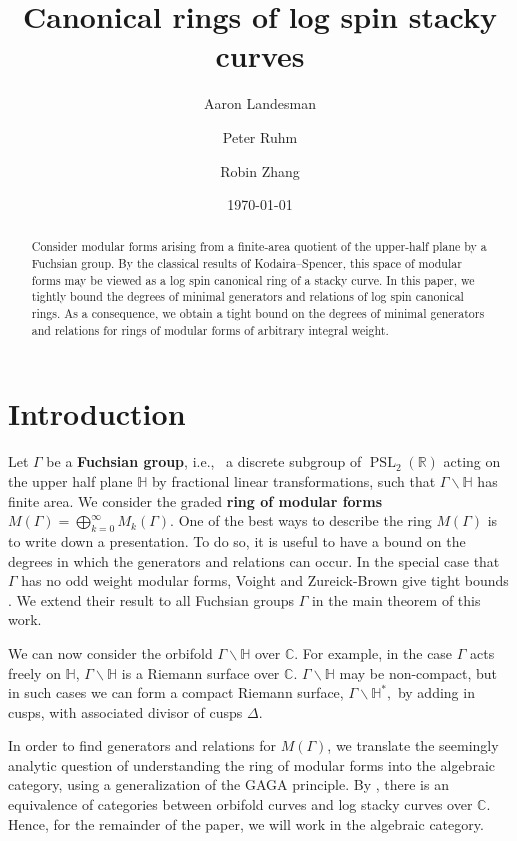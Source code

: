 \documentclass{amsart}
\title{Canonical rings of log spin stacky curves}
\author{Aaron Landesman}
\author{Peter Ruhm}
\author{Robin Zhang}
\date{\today}
\theoremstyle{plain}
\theoremstyle{definition}
\theoremstyle{remark}
\numberwithin{equation}{section}
\newcommand\BH{{\mathbb H}}
\newcommand\BC{{\mathbb C}}
\newcommand\BR{{\mathbb R}}
\newcommand{\PSL}{\operatorname{PSL}}
\begin{document}
\begin{abstract}
 	Consider modular forms arising from a finite-area
	quotient of the upper-half plane by a Fuchsian group.  
	By the classical results of Kodaira--Spencer, 
	this space of modular forms may be
	viewed as a log spin canonical ring of a stacky curve.
	In this paper, we tightly bound the degrees of minimal
	generators and relations of log spin canonical rings.  
	As a consequence, we
	obtain a tight bound on the degrees of minimal generators and relations  		
	for rings of modular forms of arbitrary integral weight.
\end{abstract}

\maketitle


\section{Introduction}
Let $\Gamma$ be a {\bf Fuchsian group}, i.e.,~ a discrete subgroup of
$\PSL_2(\BR)$ acting on the upper half plane $\BH$ by fractional
linear transformations, such that $\Gamma \backslash \BH$ has finite area.
We consider the graded {\bf ring of modular forms}
$M(\Gamma) = \bigoplus_{k = 0}^\infty M_k(\Gamma)$. One of the best ways to describe the ring $M(\Gamma)$ is to write down a presentation.
To do so, it is useful to have a bound on the
degrees in which the generators and relations can occur. In the
special case that $\Gamma$ has no odd weight modular forms, Voight
and Zureick-Brown give tight bounds \cite[Chapters 7-9]{vzb:stacky}.
We extend their result to all Fuchsian groups $\Gamma$ in the main
theorem of this work.

We can now consider the orbifold $\Gamma \backslash \BH$ over $\BC$.
For example, in the case $\Gamma$ acts freely on $\BH$, $\Gamma
\backslash \BH$ is a Riemann surface over $\BC$. 
$\Gamma \backslash \BH$ may be non-compact, but in such cases we can form a
compact Riemann surface, $\Gamma \backslash \BH^*,$ by adding in
cusps, with associated divisor of cusps $\Delta$.

In order to find generators and relations for $M(\Gamma)$, we
translate the seemingly analytic question of understanding the ring
of modular forms into the algebraic category, using a
generalization of the GAGA principle.
By \cite[Proposition 6.1.5]
{vzb:stacky}, there is an equivalence of categories between orbifold
curves and log stacky curves over $\BC$. Hence, for the remainder
of the paper, we will work in the algebraic category.
\end{document}
